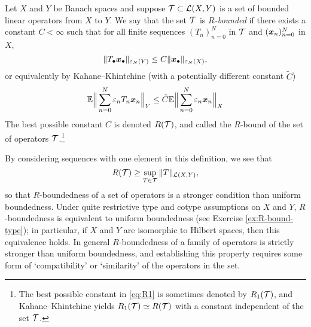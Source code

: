 {\begin{defn}
  Let $X$ and $Y$ be Banach spaces and suppose $\mathcal{T} \subset \mathcal{L}(X,Y)$ is a set of bounded linear operators from $X$ to $Y$.
We say that the set $\mathcal{T}$ is \emph{$R$-bounded} if there exists a constant $C < \infty$ such that for all finite sequences $(T_{n})_{n=0}^{N}$ in $\mathcal{T}$ and $(\bm{x}_{n})_{n=0}^{N}$ in $X$,
\begin{equation*}
  \|T_{\bullet} \bm{x}_{\bullet}\|_{\varepsilon_{N}(Y)} \leq C \|\bm{x}_{\bullet}\|_{\varepsilon_{N}(X)},
\end{equation*}
or equivalently by Kahane--Khintchine (with a potentially different constant $\tilde{C}$)
\begin{equation}\label{eq:R1}
  \mathbb{E} \Big\| \sum_{n=0}^{N} \varepsilon_{n} T_{n} \bm{x}_{n} \Big\|_{Y} \leq \tilde{C} \mathbb{E} \Big\| \sum_{n=0}^{N} \varepsilon_{n}  \bm{x}_{n} \Big\|_{X}
\end{equation}
The best possible constant $C$ is denoted $R(\mathcal{T})$, and called the $R$-bound of the set of operators $\mathcal{T}$.\footnote{The best possible constant in \eqref{eq:R1} is sometimes denoted by $R_{1}(\mathcal{T})$, and Kahane--Khintchine yields $R_{1}(\mathcal{T}) \simeq R(\mathcal{T})$ with a constant independent of the set $\mathcal{T}$.}
\end{defn}

By considering sequences with one element in this definition, we see that
\begin{equation*}
  R(\mathcal{T}) \geq \sup_{T \in \mathcal{T}} \|T\|_{\mathcal{L}(X,Y)},
\end{equation*}
so that $R$-boundedness of a set of operators is a stronger condition than uniform boundedness.
Under quite restrictive type and cotype assumptions on $X$ and $Y$, $R$-boundedness is equivalent to uniform boundedness (see Exercise \ref{ex:R-bound-type}); in particular, if $X$ and $Y$ are isomorphic to Hilbert spaces, then this equivalence holds.
In general $R$-boundedness of a family of operators is strictly stronger than uniform boundedness, and establishing this property requires some form of `compatibility' or `similarity' of the operators in the set.

}
